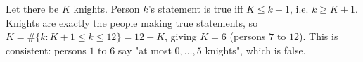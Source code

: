 Let there be $K$ knights. Person $k$'s statement is true iff $K\le k-1$, i.e. $k\ge K+1$. Knights are exactly the people making true statements, so $K=\#\{k:K+1\le k\le12\}=12-K$, giving $K=\boxed{6}$ (persons $7$ to $12$). This is consistent: persons $1$ to $6$ say "at most $0,\dots,5$ knights", which is false.

